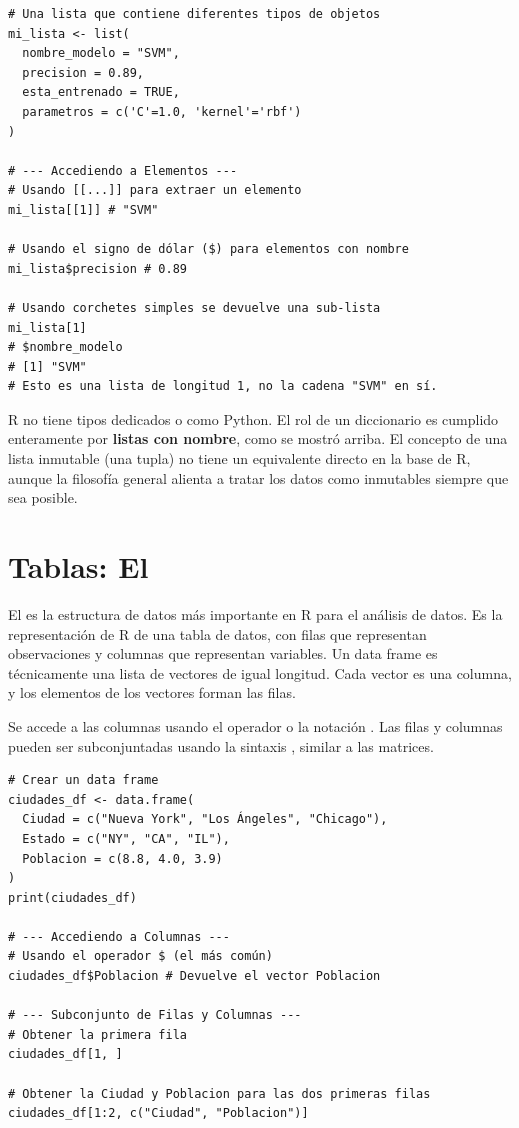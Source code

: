 \begin{example}
\text{ }\begin{verbatim}
# Una lista que contiene diferentes tipos de objetos
mi_lista <- list(
  nombre_modelo = "SVM",
  precision = 0.89,
  esta_entrenado = TRUE,
  parametros = c('C'=1.0, 'kernel'='rbf')
)

# --- Accediendo a Elementos ---
# Usando [[...]] para extraer un elemento
mi_lista[[1]] # "SVM"

# Usando el signo de dólar ($) para elementos con nombre
mi_lista$precision # 0.89

# Usando corchetes simples se devuelve una sub-lista
mi_lista[1]
# $nombre_modelo
# [1] "SVM"
# Esto es una lista de longitud 1, no la cadena "SVM" en sí.
\end{verbatim}
\end{example}

\begin{remark}
R no tiene tipos dedicados  o  como Python. El rol de un diccionario es cumplido enteramente por \textbf{listas con nombre}, como se mostró arriba. El concepto de una lista inmutable (una tupla) no tiene un equivalente directo en la base de R, aunque la filosofía general alienta a tratar los datos como inmutables siempre que sea posible.
\end{remark}

\section{Tablas: El }
\label{sec:r_data_frames}
El \textbf{} es la estructura de datos más importante en R para el análisis de datos. Es la representación de R de una tabla de datos, con filas que representan observaciones y columnas que representan variables. Un data frame es técnicamente una lista de vectores de igual longitud. Cada vector es una columna, y los elementos de los vectores forman las filas.

Se accede a las columnas usando el operador \rcode{$} o la notación \rcode{[[...]]}. Las filas y columnas pueden ser subconjuntadas usando la sintaxis , similar a las matrices.

\begin{example}
\text{ }\begin{verbatim}
# Crear un data frame
ciudades_df <- data.frame(
  Ciudad = c("Nueva York", "Los Ángeles", "Chicago"),
  Estado = c("NY", "CA", "IL"),
  Poblacion = c(8.8, 4.0, 3.9)
)
print(ciudades_df)

# --- Accediendo a Columnas ---
# Usando el operador $ (el más común)
ciudades_df$Poblacion # Devuelve el vector Poblacion

# --- Subconjunto de Filas y Columnas ---
# Obtener la primera fila
ciudades_df[1, ]

# Obtener la Ciudad y Poblacion para las dos primeras filas
ciudades_df[1:2, c("Ciudad", "Poblacion")]
\end{verbatim}
\end{example}

